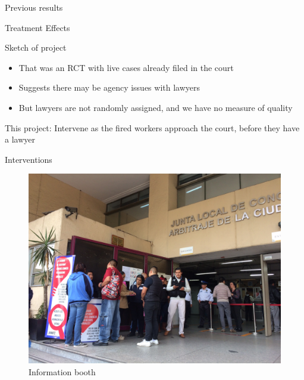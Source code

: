\documentclass[8pt]{beamer}
\begin{document}
\begin{frame}{Previous results}

\begin{table}[H]
    \caption{Treatment Effects}
    \label{Treatment_effects}
    \begin{center}
    \scriptsize{}
    \end{center}
\end{table}


\end{frame}

\begin{frame}{Sketch of project}
\begin{itemize}
    \item That was an RCT with live cases already filed in the court
   \item Suggests there may be agency issues with lawyers
  \item But lawyers are not randomly assigned, and we have no measure of quality
\end{itemize}

This project: Intervene as the fired workers approach the court, before they have a lawyer
 \end{frame}
 
 \begin{frame}{Interventions}

\begin{figure}[H]
    \caption{Information booth}
    \begin{center}
    \includegraphics[width=1\textwidth]{presentations/IMG_1437.jpg}
    \end{center}
\end{figure}
\end{frame}
\end{document}
